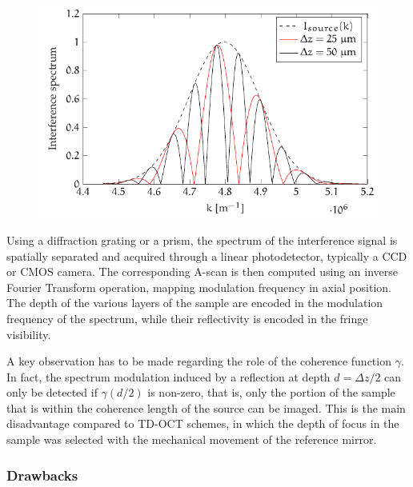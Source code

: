 \begin{figure}[hbt]
	\myfloatalign
	\includegraphics[width=0.85\linewidth]{gfx/tikz/fdoct-spectrum}
	\caption{}\label{fig:fdoct-spectrum}
\end{figure}

Using a diffraction grating or a prism, the spectrum of the interference signal is spatially separated and acquired through a linear photodetector, typically a \ac{CCD} or \ac{CMOS} camera. The corresponding A-scan is then computed using an inverse Fourier Transform operation, mapping modulation frequency in axial position. The depth of the various layers of the sample are encoded in the modulation frequency of the spectrum, while their reflectivity is encoded in the fringe visibility. 

A key observation has to be made regarding the role of the coherence function $\gamma$. In fact, the spectrum modulation induced by a reflection at depth $d=\Delta z /2$ can only be detected if $\gamma(d/2)$ is non-zero, that is, only the portion of the sample that is within the coherence length of the source can be imaged. This is the main disadvantage compared to \ac{TD-OCT} schemes, in which the depth of focus in the sample was selected with the mechanical movement of the reference mirror.


\subsubsection{Drawbacks}

